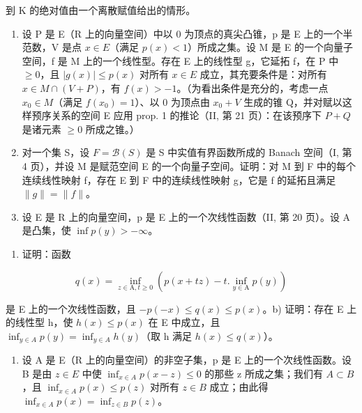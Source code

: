 到 K 的绝对值由一个离散赋值给出的情形。

\exercisegroup

\begin{enumerate}
\def\labelenumi{\arabic{enumi})}
\item
  设 P 是 E（R 上的向量空间）中以 0 为顶点的真尖凸锥，p 是 E 上的一个半范数，V 是点 \(x \in E\)（满足 \(p(x) < 1\)）所成之集。设 M 是 E 的一个向量子空间，f 是 M 上的一个线性型。存在 E 上的线性型 g，它延拓 f，在 P 中 \(\geqslant 0\)，且 \(|g(x)| \leqslant p(x)\) 对所有 \(x \in E\) 成立，其充要条件是：对所有 \(x \in M \cap (V + P)\)，有 \(f(x) > -1\)。（为看出条件是充分的，考虑一点 \(x_0 \in M\)（满足 \(f(x_0) = 1\)）、以 0 为顶点由 \(x_0 + V\) 生成的锥 Q，并对赋以这样预序关系的空间 E 应用 prop. 1 的推论（II, 第 21 页）：在该预序下 \(P + Q\) 是诸元素 \(\geqslant 0\) 所成之锥。）
\item
  对一个集 S，设 \(F = \mathcal{B}(S)\) 是 S 中实值有界函数所成的 Banach 空间（I, 第 4 页），并设 M 是赋范空间 E 的一个向量子空间。证明：对 M 到 F 中的每个连续线性映射 f，存在 E 到 F 中的连续线性映射 g，它是 f 的延拓且满足 \(\|g\| = \|f\|\)。
\item
  设 E 是 R 上的向量空间，p 是 E 上的一个次线性函数（II, 第 20 页）。设 A 是凸集，使 \(\inf p(y) > -\infty\)。
\end{enumerate}

\begin{enumerate}
\def\labelenumi{\alph{enumi})}
\tightlist
\item
  证明：函数
\end{enumerate}

\[
q (x) = \inf _ {z \in \mathrm{A}, t \geqslant 0} \left(p (x + t z) - t. \inf _ {y \in \mathrm{A}} p (y)\right)
\]

是 E 上的一个次线性函数，且 \(-p(-x) \leqslant q(x) \leqslant p(x)\)。b) 证明：存在 E 上的线性型 h，使 \(h(x) \leqslant p(x)\) 在 E 中成立，且 \(\inf_{y \in A} p(y) = \inf_{y \in A} h(y)\)（取 h 满足 \(h(x) \leqslant q(x)\)）。

\begin{enumerate}
\def\labelenumi{\arabic{enumi})}
\setcounter{enumi}{3}
\tightlist
\item
  设 A 是 E（R 上的向量空间）的非空子集，p 是 E 上的一个次线性函数。设 B 是由 \(z \in E\) 中使 \(\inf_{x \in A} p(x - z) \leqslant 0\) 的那些 z 所成之集；我们有 \(A \subset B\)，且 \(\inf_{x \in A} p(x) \leqslant p(z)\) 对所有 \(z \in B\) 成立；由此得 \(\inf_{x \in A} p(x) = \inf_{z \in B} p(z)\)。
\end{enumerate}


